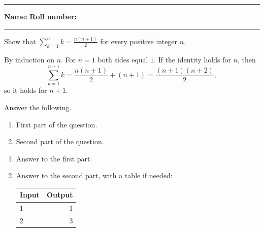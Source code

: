 \medskip
\noindent\rule{\textwidth}{0.8pt}
\noindent\textbf{Name:} \studentname \hfill \textbf{Roll number:} \rollnumber
\par\noindent\rule{\textwidth}{0.4pt}

\begin{problem}[10 marks]
Show that $\sum_{k=1}^{n} k = \frac{n(n+1)}{2}$ for every positive integer $n$.
\end{problem}

\begin{solution}
By induction on $n$. For $n = 1$ both sides equal $1$. If the identity holds
for $n$, then
\[
  \sum_{k=1}^{n+1} k = \frac{n(n+1)}{2} + (n+1) = \frac{(n+1)(n+2)}{2},
\]
so it holds for $n + 1$.
\end{solution}

\begin{problem}[5 marks]
Answer the following.
\begin{enumerate}[label=(\alph*)]
  \item First part of the question.
  \item Second part of the question.
\end{enumerate}
\end{problem}

\begin{solution}
\begin{enumerate}[label=(\alph*)]
  \item Answer to the first part.
  \item Answer to the second part, with a table if needed:

  \begin{tabular}{@{}lr@{}}
    \toprule
    Input & Output \\
    \midrule
    1 & 1 \\
    2 & 3 \\
    \bottomrule
  \end{tabular}
\end{enumerate}
\end{solution}


